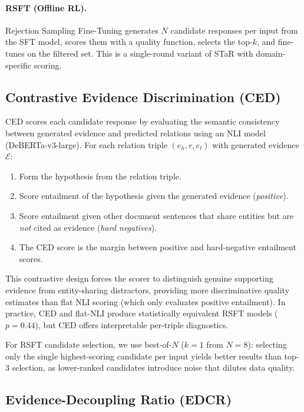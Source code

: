 \documentclass[11pt,a4paper]{article}
\begin{document}
\paragraph{RSFT (Offline RL).}
Rejection Sampling Fine-Tuning generates $N$ candidate responses per input from the SFT model, scores them with a quality function, selects the top-$k$, and fine-tunes on the filtered set.
This is a single-round variant of STaR with domain-specific scoring.

\subsection{Contrastive Evidence Discrimination (CED)}

CED scores each candidate response by evaluating the semantic consistency between generated evidence and predicted relations using an NLI model (DeBERTa-v3-large).
For each relation triple $(e_h, r, e_t)$ with generated evidence $\mathcal{E}$:

\begin{enumerate}
\item Form the hypothesis from the relation triple.
\item Score entailment of the hypothesis given the generated evidence (\emph{positive}).
\item Score entailment given other document sentences that share entities but are \emph{not} cited as evidence (\emph{hard negatives}).
\item The CED score is the margin between positive and hard-negative entailment scores.
\end{enumerate}

This contrastive design forces the scorer to distinguish genuine supporting evidence from entity-sharing distractors, providing more discriminative quality estimates than flat NLI scoring (which only evaluates positive entailment).
In practice, CED and flat-NLI produce statistically equivalent RSFT models ($p=0.44$), but CED offers interpretable per-triple diagnostics.

For RSFT candidate selection, we use best-of-$N$ ($k=1$ from $N=8$): selecting only the single highest-scoring candidate per input yields better results than top-3 selection, as lower-ranked candidates introduce noise that dilutes data quality.

\subsection{Evidence-Decoupling Ratio (EDCR)}
\end{document}
